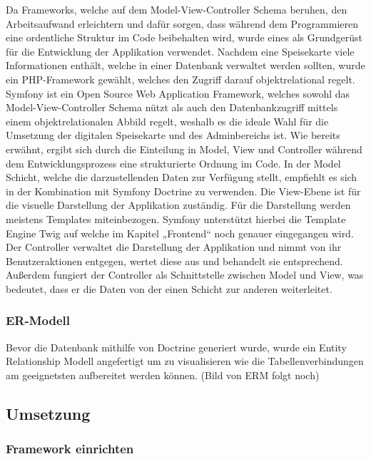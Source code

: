 	Da Frameworks, welche auf dem Model-View-Controller Schema beruhen, den Arbeitsaufwand erleichtern und dafür sorgen, dass während dem Programmieren eine ordentliche Struktur im Code beibehalten wird, wurde eines als Grundgerüst für die Entwicklung der Applikation verwendet. Nachdem eine Speisekarte viele Informationen enthält, welche in einer Datenbank verwaltet werden sollten, wurde ein PHP-Framework gewählt, welches den Zugriff darauf objektrelational regelt.
	Symfony ist ein Open Source Web Application Framework, welches sowohl das Model-View-Controller Schema nützt als auch den Datenbankzugriff mittels einem objektrelationalen Abbild regelt, weshalb es die ideale Wahl für die Umsetzung der digitalen Speisekarte und des Adminbereichs ist. Wie bereits erwähnt, ergibt sich durch die Einteilung in Model, View und Controller während dem Entwicklungsprozess eine strukturierte Ordnung im Code. In der Model Schicht, welche die darzustellenden Daten zur Verfügung stellt, empfiehlt es sich in der Kombination mit Symfony Doctrine zu verwenden. Die View-Ebene ist für die visuelle Darstellung der Applikation zuständig. Für die  Darstellung werden meistens Templates miteinbezogen. Symfony unterstützt hierbei die Template Engine Twig auf welche im Kapitel „Frontend“ noch genauer eingegangen wird.
	Der Controller verwaltet die Darstellung der Applikation und nimmt von ihr Benutzeraktionen entgegen, wertet diese aus und behandelt sie entsprechend. Außerdem fungiert der Controller als Schnittstelle zwischen Model und View, was bedeutet, dass er die Daten von der einen Schicht zur anderen weiterleitet.

    \subsubsection{ER-Modell}

	Bevor die Datenbank mithilfe von Doctrine generiert wurde, wurde ein Entity Relationship Modell angefertigt um zu visualisieren wie die Tabellenverbindungen am geeignetsten aufbereitet werden können.
	(Bild von ERM folgt noch)

  \subsection{Umsetzung}

    \subsubsection{Framework einrichten}

